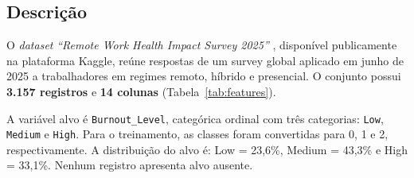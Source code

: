 \documentclass[conference]{IEEEtran}
\begin{document}
\subsection{Descrição}

O \textit{dataset} \textit{``Remote Work Health Impact Survey 2025''}
\cite{kaggle_dataset}, disponível publicamente na plataforma Kaggle,
reúne respostas de um survey global aplicado em junho de 2025 a
trabalhadores em regimes remoto, híbrido e presencial. O conjunto possui
\textbf{3.157 registros} e \textbf{14 colunas} (Tabela~\ref{tab:features}).

A variável alvo é \texttt{Burnout_Level}, categórica ordinal com três
categorias: \texttt{Low}, \texttt{Medium} e \texttt{High}. Para o treinamento,
as classes foram convertidas para 0, 1 e 2, respectivamente. A distribuição
do alvo é: Low = 23,6\%, Medium = 43,3\% e High = 33,1\%. Nenhum registro
apresenta alvo ausente.
\end{document}
